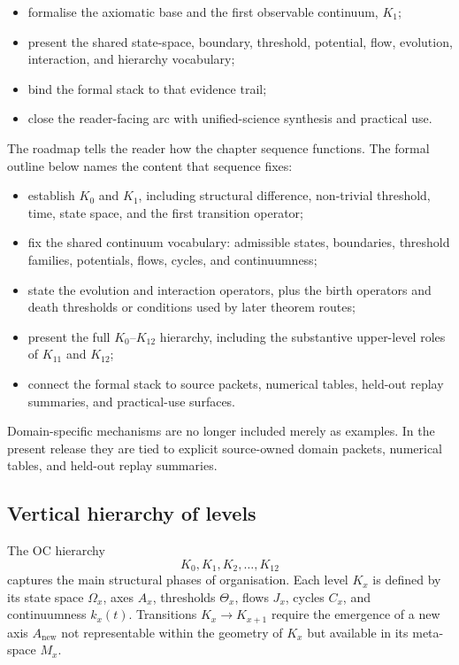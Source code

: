 \begin{itemize}
    \item formalise the axiomatic base and the first observable continuum,
          \(K_1\);
    \item present the shared state-space, boundary, threshold, potential, flow,
          evolution, interaction, and hierarchy vocabulary;
    \item bind the formal stack to that evidence trail;
    \item close the reader-facing arc with unified-science synthesis and
          practical use.
\end{itemize}

The roadmap tells the reader how the chapter sequence functions. The formal
outline below names the content that sequence fixes:

\begin{itemize}
    \item establish \(K_0\) and \(K_1\), including structural difference,
          non-trivial threshold, time, state space, and the first transition
          operator;
    \item fix the shared continuum vocabulary: admissible states, boundaries,
          threshold families, potentials, flows, cycles, and continuumness;
    \item state the evolution and interaction operators, plus the birth
          operators and death thresholds or conditions used by later theorem
          routes;
    \item present the full \(K_0\)–\(K_{12}\) hierarchy, including the
          substantive upper-level roles of \(K_{11}\) and \(K_{12}\);
    \item connect the formal stack to source packets, numerical tables,
          held-out replay summaries, and practical-use surfaces.
\end{itemize}

Domain-specific mechanisms are no longer included merely as examples. In the
present release they are tied to explicit source-owned domain packets,
numerical tables, and held-out replay summaries.

\subsection{Vertical hierarchy of levels}

The OC hierarchy
\[
K_0, K_1, K_2, \dots, K_{12}
\]
captures the main structural phases of organisation. Each level \(K_x\) is defined by its state space \(\Omega_x\), axes \(A_x\), thresholds \(\Theta_x\), flows \(J_x\), cycles \(C_x\), and continuumness \(k_x(t)\). Transitions \(K_x \to K_{x+1}\) require the emergence of a new axis \(A_{\mathrm{new}}\) not representable within the geometry of \(K_x\) but available in its meta-space \(M_x\).

